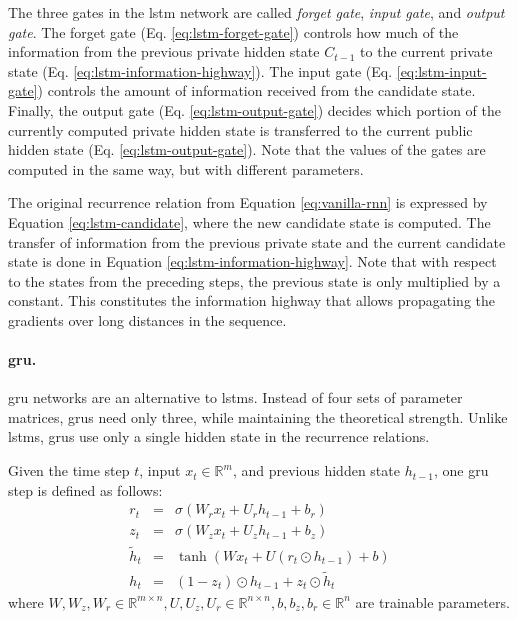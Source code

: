 The three gates in the \gls{lstm} network are called \emph{forget gate},
\emph{input gate}, and \emph{output gate}. The forget gate (Eq.
\ref{eq:lstm-forget-gate}) controls how much of the information from the
previous private hidden state $C_{t-1}$ to the current private state (Eq.
\ref{eq:lstm-information-highway}). The input gate (Eq.
\ref{eq:lstm-input-gate}) controls the amount of information received from the
candidate state. Finally, the output gate (Eq. \ref{eq:lstm-output-gate})
decides which portion of the currently computed private hidden state is
transferred to the current public hidden state
(Eq. \ref{eq:lstm-output-gate}). Note that the values of the gates are computed
in the same way, but with different parameters.

The original recurrence relation from Equation \ref{eq:vanilla-rnn} is expressed
by Equation \ref{eq:lstm-candidate}, where the new candidate state is
computed. The transfer of information from the previous private state and the
current candidate state is done in Equation
\ref{eq:lstm-information-highway}. Note that with respect to the states from the
preceding steps, the previous state is only multiplied by a constant. This
constitutes the information highway that allows propagating the gradients over
long distances in the sequence.




\paragraph{\acrshort{gru}.} \acrlong{gru} networks \citep{cho2014gru} are an
alternative to \glspl{lstm}. Instead of four sets of parameter matrices,
\glspl{gru} need only three, while maintaining the theoretical strength. Unlike
\glspl{lstm}, \glspl{gru} use only a single hidden state in the recurrence
relations.

Given the time step $t$, input $x_t \in \mathbb{R}^m$, and previous hidden state
$h_{t-1}$, one \gls{gru} step is defined as follows:
%
\begin{eqnarray} r_t & = & \sigma\left(W_r x_t + U_r h_{t-1} + b_r\right)
\label{eq:gru-reset-gate} \\ z_t & = & \sigma\left(W_z x_t + U_z h_{t-1} +
b_z\right)
\label{eq:gru-update-gate} \\ \tilde{h}_t & = & \tanh \left(W x_t + U \left( r_t
\odot h_{t-1} \right) + b \right) \label{eq:gru-candidate} \\ h_t & = & (1 -
z_t) \odot h_{t-1} + z_t \odot \tilde{h}_t
\label{eq:gru-hidden-state}
\end{eqnarray}
%
where $W, W_z, W_r \in \mathbb{R}^{m\times n}, U, U_z, U_r \in \mathbb{R}^{n
\times n}, b, b_z, b_r \in \mathbb{R}^n$ are trainable parameters.

